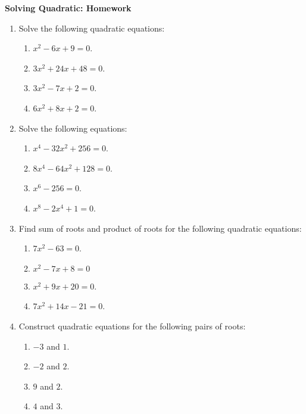 \documentclass[12pt]{article}
\begin{document}
    \begin{center}
        \textbf{Solving Quadratic: Homework}
    \end{center}

    \begin{enumerate}
        \item Solve the following quadratic equations:\begin{enumerate}
            \item $x^2-6x+9=0$.
            \item $3x^2+24x+48=0$.
            \item $3x^2-7x+2=0$.
            \item $6x^2+8x+2=0$.
        \end{enumerate}
        \item Solve the following equations:\begin{enumerate}
            \item $x^4-32x^2+256=0$.
            \item $8x^4-64x^2+128=0$.
            \item $x^6-256=0$.
            \item $x^8-2x^4+1=0$.
        \end{enumerate}
        \item Find sum of roots and product of roots for the following quadratic equations:\begin{enumerate}
            \item $7x^2-63=0$.
            \item $x^2-7x+8=0$
            \item $x^2+9x+20=0$.
            \item $7x^2+14x-21=0$.
        \end{enumerate}
        \item Construct quadratic equations for the following pairs of roots:\begin{enumerate}
            \item $-3$ and $1$.
            \item $-2$ and $2$.
            \item $9$ and $2$.
            \item $4$ and $3$.
        \end{enumerate}
    \end{enumerate}
\end{document}
